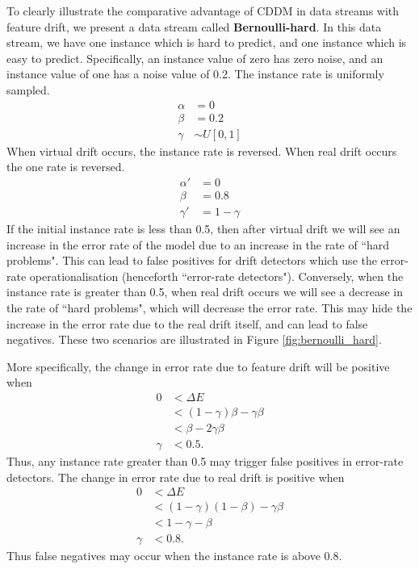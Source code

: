 To clearly illustrate the comparative advantage of CDDM in data streams with feature drift, we present a data stream called {\bf Bernoulli-hard}. In this data stream, we have one instance which is hard to predict, and one instance which is easy to predict. Specifically, an instance value of zero has zero noise, and an instance value of one has a noise value of 0.2. The instance rate is uniformly sampled.
\begin{align}
  \alpha &= 0 \\
  \beta &= 0.2 \\
  \gamma &\sim U[0,1]
\end{align}
When virtual drift occurs, the instance rate is reversed. When real drift occurs the one rate is reversed.
\begin{align}
  \alpha' &= 0 \\
  \beta &= 0.8 \\
  \gamma' &= 1 - \gamma
\end{align}
If the initial instance rate is less than 0.5, then after virtual drift we will see an increase in the error rate of the model due to an increase in the rate of ``hard problems". This can lead to false positives for drift detectors which use the error-rate operationalisation (henceforth ``error-rate detectors"). Conversely, when the instance rate is greater than 0.5, when real drift occurs we will see a decrease in the rate of ``hard problems", which will decrease the error rate. This may hide the increase in the error rate due to the real drift itself, and can lead to false negatives. These two scenarios are illustrated in Figure \ref{fig:bernoulli_hard}.

More specifically, the change in error rate due to feature drift will be positive when
\begin{align}
  0 &< \Delta E \\
  &< (1-\gamma)\beta - \gamma \beta \\
  &< \beta-2\gamma\beta \\
  \gamma &< 0.5.
\end{align}
Thus, any instance rate greater than 0.5 may trigger false positives in error-rate detectors. The change in error rate due to real drift is positive when
\begin{align}
  0 &< \Delta E \\
  &< (1-\gamma)(1-\beta) - \gamma\beta \\
  &< 1 - \gamma - \beta \\
  \gamma &< 0.8.
\end{align}
Thus false negatives may occur when the instance rate is above 0.8.

